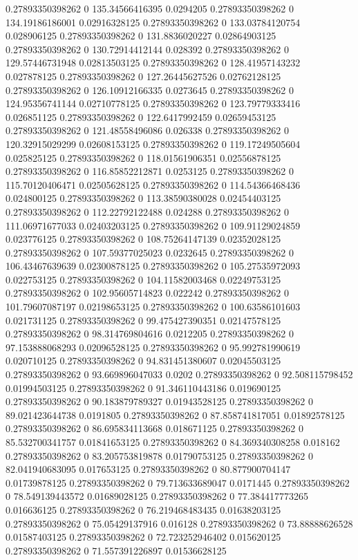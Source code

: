 0.27893350398262 0 135.34566416395 0.0294205
0.27893350398262 0 134.19186186001 0.02916328125
0.27893350398262 0 133.03784120754 0.028906125
0.27893350398262 0 131.8836020227 0.02864903125
0.27893350398262 0 130.72914412144 0.028392
0.27893350398262 0 129.57446731948 0.02813503125
0.27893350398262 0 128.41957143232 0.027878125
0.27893350398262 0 127.26445627526 0.02762128125
0.27893350398262 0 126.10912166335 0.0273645
0.27893350398262 0 124.95356741144 0.02710778125
0.27893350398262 0 123.79779333416 0.026851125
0.27893350398262 0 122.6417992459 0.02659453125
0.27893350398262 0 121.48558496086 0.026338
0.27893350398262 0 120.32915029299 0.02608153125
0.27893350398262 0 119.17249505604 0.025825125
0.27893350398262 0 118.01561906351 0.02556878125
0.27893350398262 0 116.85852212871 0.0253125
0.27893350398262 0 115.70120406471 0.02505628125
0.27893350398262 0 114.54366468436 0.024800125
0.27893350398262 0 113.38590380028 0.02454403125
0.27893350398262 0 112.22792122488 0.024288
0.27893350398262 0 111.06971677033 0.02403203125
0.27893350398262 0 109.91129024859 0.023776125
0.27893350398262 0 108.75264147139 0.02352028125
0.27893350398262 0 107.59377025023 0.0232645
0.27893350398262 0 106.43467639639 0.02300878125
0.27893350398262 0 105.27535972093 0.022753125
0.27893350398262 0 104.11582003468 0.02249753125
0.27893350398262 0 102.95605714823 0.022242
0.27893350398262 0 101.79607087197 0.02198653125
0.27893350398262 0 100.63586101603 0.021731125
0.27893350398262 0 99.475427390351 0.02147578125
0.27893350398262 0 98.314769804616 0.0212205
0.27893350398262 0 97.153888068293 0.02096528125
0.27893350398262 0 95.992781990619 0.020710125
0.27893350398262 0 94.831451380607 0.02045503125
0.27893350398262 0 93.669896047033 0.0202
0.27893350398262 0 92.508115798452 0.01994503125
0.27893350398262 0 91.346110443186 0.019690125
0.27893350398262 0 90.183879789327 0.01943528125
0.27893350398262 0 89.021423644738 0.0191805
0.27893350398262 0 87.858741817051 0.01892578125
0.27893350398262 0 86.695834113668 0.018671125
0.27893350398262 0 85.532700341757 0.01841653125
0.27893350398262 0 84.369340308258 0.018162
0.27893350398262 0 83.205753819878 0.01790753125
0.27893350398262 0 82.041940683095 0.017653125
0.27893350398262 0 80.877900704147 0.01739878125
0.27893350398262 0 79.713633689047 0.0171445
0.27893350398262 0 78.549139443572 0.01689028125
0.27893350398262 0 77.384417773265 0.016636125
0.27893350398262 0 76.219468483435 0.01638203125
0.27893350398262 0 75.05429137916 0.016128
0.27893350398262 0 73.88888626528 0.01587403125
0.27893350398262 0 72.723252946402 0.015620125
0.27893350398262 0 71.557391226897 0.01536628125
